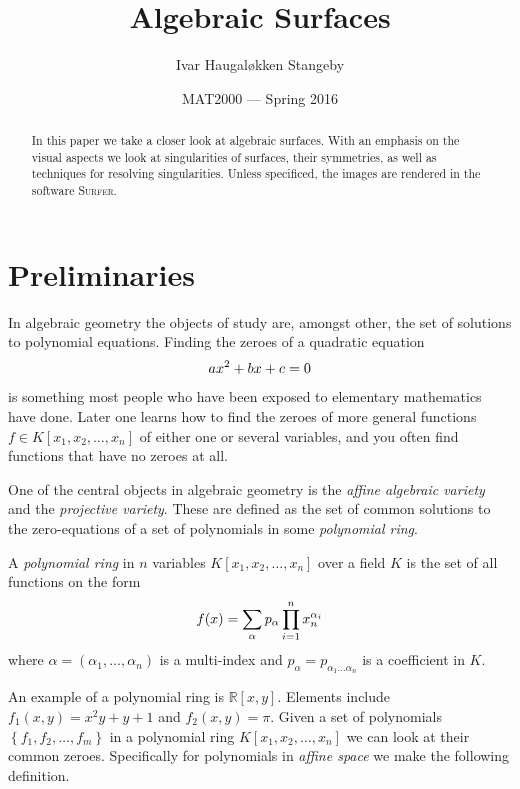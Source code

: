 \documentclass{article}
\title{Algebraic Surfaces}
\author{Ivar Haugal{\o}kken Stangeby}
\date{MAT2000 --- Spring 2016}
\newcommand{\R}{\mathbb{R}}
\begin{document}
\maketitle    

\begin{abstract}
    In this paper we take a closer look at algebraic surfaces. With an emphasis
    on the visual aspects we look at singularities of surfaces, their
    symmetries, as well as techniques for resolving singularities. Unless
    specificed, the images are rendered in the software \textsc{Surfer}.
\end{abstract}

\tableofcontents

\section{Preliminaries}
\label{sec:preliminaries}

In algebraic geometry the objects of study are, amongst other, the set of
solutions to polynomial equations. Finding the zeroes of a quadratic equation
\begin{equation}
    \notag
    ax^2 + bx + c = 0
\end{equation} 
is something most people who have been exposed to elementary mathematics have
done. Later one learns how to find the zeroes of more general functions $f \in
K[x_1, x_2, \ldots, x_n]$ of either one or several variables, and you often
find functions that have no zeroes at all. 

One of the central objects in algebraic geometry is the \emph{affine algebraic
variety} and the \emph{projective
variety}. These are defined as the set of
common solutions to the zero-equations of a set of polynomials in some
\emph{polynomial ring}.

\begin{definition}
    A \emph{polynomial ring} in $n$ variables $K[x_1, x_2, \ldots, x_{n}]$ over a
    field $K$ is the set of all functions on the form
    \begin{equation}
        \notag
        f(x) = \sum_{\alpha} p_\alpha \prod_{i=1}^{n} x_n^{\alpha_i}
    \end{equation}
    where $\alpha = (\alpha_1, \ldots, \alpha_n)$ is a multi-index and
    $p_\alpha = p_{\alpha_1\ldots\alpha_n}$ is a coefficient in $K$.
\end{definition}
An example of a polynomial ring is $\R[x, y]$. Elements include $f_1(x, y) =
x^2y + y + 1$ and $f_2(x, y) = \pi$. Given a set of polynomials $\left\{f_1, f_2, \ldots,
f_m\right\}$ in a polynomial ring $K \left[ x_1, x_2, \ldots, x_n \right]$ we can look at
their common zeroes. Specifically for polynomials in \emph{affine space} we
make the following definition.
\end{document}
